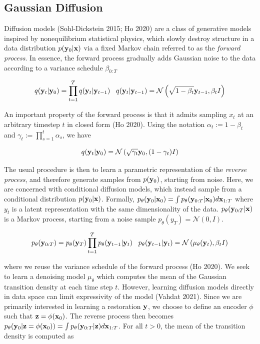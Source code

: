 \documentclass{article}
\begin{document}
\subsection{Gaussian Diffusion}

Diffusion models (Sohl-Dickstein 2015; Ho 2020) are a class of generative models inspired by nonequilibrium statistical physics, which slowly destroy structure in a data distribution $p(\bold{y}_{0}|\bold{x})$ via a fixed Markov chain referred to as the \emph{forward process}. In essence, the forward process gradually adds Gaussian noise to the data according to a variance schedule $\beta_{0:T}$

\begin{equation}
q(\bold{y}_{t}|\bold{y}_{0}) = \prod_{t=1}^{T}q(\bold{y}_{t}|\bold{y}_{t-1}) \;\;\; q(\bold{y}_{t}|\bold{y}_{t-1}) = \mathcal{N}\left(\sqrt{1-\beta_{t}}\bold{y}_{t-1},\beta_t I\right)
\end{equation}

An important property of the forward process is that it admits sampling $x_t$ at an arbitrary timestep $t$ in closed form (Ho 2020). Using the notation $\alpha_t := 1 - \beta_t$ and $\gamma_t := \prod_{s=1}^{t} \alpha_s$, we have

\begin{equation}
q(\bold{y}_t|\bold{y}_0) = \mathcal{N} \left(\sqrt{\gamma_{t}} \bold{y}_{0}, (1 - \gamma_t)I \right)
\end{equation}


The usual procedure is then to learn a parametric representation of the \emph{reverse process}, and therefore generate samples from  $p(\bold{y}_{0})$, starting from noise. Here, we are concerned with conditional diffusion models, which  instead sample from a conditional distribution $p(\bold{y}_{0}|\bold{x})$. Formally, $p_{\theta}(\bold{y}_{0}|\bold{x}_{0}) = \int p_{\theta}(\bold{y}_{0:T}|\bold{x}_{0})d\bold{x}_{1:T}$ where $y_{t}$ is a latent representation with the same dimensionality of the data.  $p_{\theta}(\bold{y}_{0:T}|\bold{x})$ is a Markov process, starting from a noise sample $p_{\theta}(y_{T}) = \mathcal{N}(0,I)$. 

\begin{equation}
p_{\theta}(\bold{y}_{0:T}) = p_{\theta}(\bold{y}_{T})\prod_{t=1}^{T} p_{\theta}(\bold{y}_{t-1}|\bold{y}_{t}) \;\;\; p_{\theta}(\bold{y}_{t-1}|\bold{y}_{t}) = \mathcal{N}\left(\mu_{\theta}(\bold{y}_{t}),\beta_{t}I\right)
\end{equation}

where we reuse the variance schedule of the forward process (Ho 2020). We seek to learn a denoising model $\mu_{\theta}$ which computes the mean of the Gaussian transition density at each time step $t$. However, learning diffusion models directly in data space can limit expressivity of the model (Vahdat 2021). Since we are primarily interested in learning a restoration $\bold{y}$, we choose to define an encoder $\phi$ such that $\bold{z} = \phi(\bold{x}_{0})$. The reverse process then becomes $p_{\theta}(\bold{y}_{0}|\bold{z}=\phi(\bold{x}_{0})) = \int p_{\theta}(\bold{y}_{0:T}|\bold{z})d\bold{x}_{1:T}$. For all $t > 0$, the mean of the transition density is computed as
\end{document}
